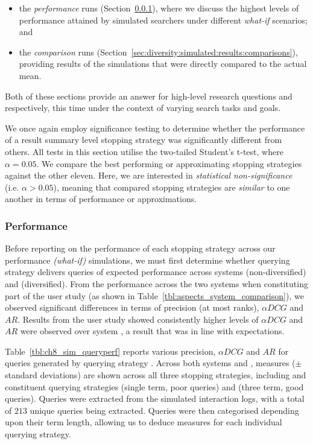 \begin{itemize}
    \item{the \emph{performance} runs (Section~\ref{sec:diversity:simulated:results:perf}), where we discuss the highest levels of performance attained by simulated searchers under different \emph{what-if} scenarios; and}
    \item{the \emph{comparison} runs (Section~\ref{sec:diversity:simulated:results:comparisons}), providing results of the simulations that were directly compared to the actual mean.}
\end{itemize}

Both of these sections provide an answer for high-level research questions  and  respectively, this time under the context of varying search tasks and goals.

We once again employ significance testing to determine whether the performance of a result summary level stopping strategy was significantly different from others. All tests in this section utilise the two-tailed Student's t-test, where $\alpha=0.05$. We compare the best performing or approximating stopping strategies against the other eleven. Here, we are interested in \emph{statistical non-significance} (i.e. $\alpha > 0.05$), meaning that compared stopping strategies are \emph{similar} to one another in terms of performance or approximations.

\subsubsection{Performance}\label{sec:diversity:simulated:results:perf}
\vspace*{-3mm}
Before reporting on the performance of each stopping strategy across our performance \emph{(what-if)} simulations, we must first determine whether querying strategy  delivers queries of expected performance across systems  (non-diversified) and  (diversified). From the performance across the two systems when constituting part of the user study (as shown in Table~\ref{tbl:aspects_system_comparison}), we observed significant differences in terms of precision (at most ranks), $\alpha DCG$ and $AR$. Results from the user study showed consistently higher levels of $\alpha DCG$ and $AR$ were observed over system , a result that was in line with expectations.

Table~\ref{tbl:ch8_sim_queryperf} reports various precision, $\alpha DCG$ and $AR$ for queries generated by querying strategy . Across both systems  and , measures ($\pm$ standard deviations) are shown across all three stopping strategies, including  and constituent querying strategies  (single term, poor queries) and  (three term, good queries). Queries were extracted from the simulated interaction logs, with a total of $213$ unique queries being extracted. Queries were then categorised depending upon their term length, allowing us to deduce measures for each individual querying strategy.

